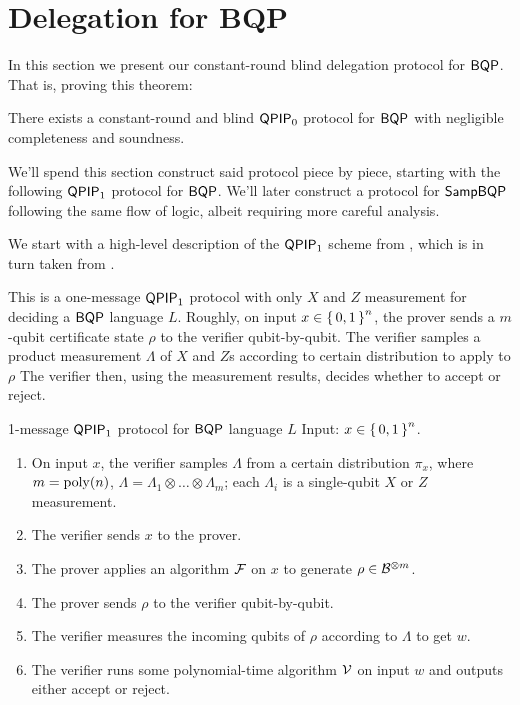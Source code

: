 \section{Delegation for BQP}
\label{sec:BlindBQP}




In this section we present our constant-round blind delegation protocol for $\operatorname{\mathsf{BQP}}$. That is, proving this theorem:
\begin{thm}
	\label{thm:QPIP0BQP}
	There exists a constant-round and blind $\operatorname{\mathsf{QPIP}}_0$ protocol for $\operatorname{\mathsf{BQP}}$ with negligible completeness and soundness.
\end{thm}
We'll spend this section construct said protocol piece by piece, starting with the following $\operatorname{\mathsf{QPIP}}_1$ protocol for $\operatorname{\mathsf{BQP}}$.
We'll later construct a protocol for $\operatorname{\mathsf{SampBQP}}$ following the same flow of logic, albeit requiring more careful analysis.

We start with a high-level description of the $\operatorname{\mathsf{QPIP}}_1$ scheme from \cite{mahadev_delegation}, which is in turn taken from \cite{mf16}.

This is a one-message $\operatorname{\mathsf{QPIP}}_1$ protocol with only $X$ and $Z$ measurement for deciding a $\operatorname{\mathsf{BQP}}$ language $L$.
Roughly, on input $x\in\set{0,1}^n$, the prover sends a $m$-qubit certificate state $\rho$ to the verifier qubit-by-qubit.
The verifier samples a product measurement $\Lambda$ of $X$ and $Z$s according to certain distribution to apply to $\rho$
The verifier then, using the measurement results, decides whether to accept or reject.

\begin{protocol}{1-message $\operatorname{\mathsf{QPIP}}_1$ protocol for $\operatorname{\mathsf{BQP}}$ language $L$}
	\label{proto:BQP}
	Input: $x\in\set{0,1}^n$.
	\begin{enumerate}
		\item On input $x$, the verifier samples $\Lambda$ from a certain distribution $\pi_x$, where $m=\operatorname*{\operatorname{poly}}(n)$, $\Lambda=\Lambda_1\otimes\ldots\otimes\Lambda_m$; each $\Lambda_i$ is a single-qubit $X$ or $Z$ measurement.
		\item The verifier sends $x$ to the prover.
		\item The prover applies an algorithm $\mathcal{F}$  on $x$ to generate $\rho\in\mathcal{B}^{\otimes m}$.
		\item The prover sends $\rho$ to the verifier qubit-by-qubit.
		\item The verifier measures the incoming qubits of $\rho$ according to $\Lambda$ to get $w$.
		\item The verifier runs some polynomial-time algorithm $\mathcal{V}$ on input $w$ and outputs either accept or reject.
	\end{enumerate}
\end{protocol}


